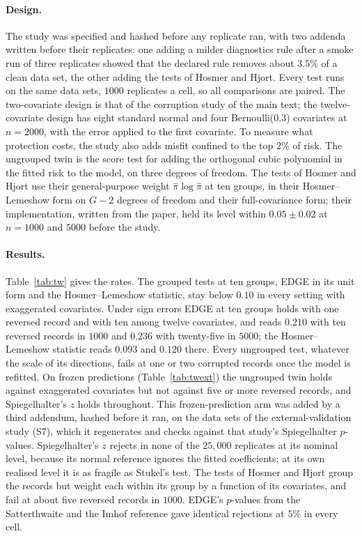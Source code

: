 \documentclass[11pt]{article}
\begin{document}
\paragraph{Design.} The study was specified and hashed before any replicate ran, with two addenda written
before their replicates: one adding a milder diagnostics rule after a smoke run of three replicates showed
that the declared rule removes about $3.5\%$ of a clean data set, the other adding the tests of Hosmer and
Hjort. Every test runs on the same data sets, $1000$ replicates a cell, so all comparisons are paired. The
two-covariate design is that of the corruption study of the main text; the twelve-covariate design has
eight standard normal and four Bernoulli($0.3$) covariates at $n=2000$, with the error applied to the first
covariate. To measure what protection costs, the study also adds misfit confined to the top $2\%$ of
risk. The ungrouped twin is the score test for adding the orthogonal cubic polynomial in the fitted
risk to the model, on three degrees of freedom. The tests of Hosmer and Hjort use their general-purpose
weight $\hat\pi\log\hat\pi$ at ten groups, in their Hosmer--Lemeshow form on $G-2$ degrees of freedom and
their full-covariance form; their implementation, written from the paper, held its level within
$0.05\pm0.02$ at $n=1000$ and $5000$ before the study.

\paragraph{Results.} Table~\ref{tab:tw} gives the rates. The grouped tests at ten groups, EDGE in its unit form and the Hosmer--Lemeshow statistic, stay below
$0.10$ in every setting with exaggerated covariates. Under sign errors EDGE at ten groups holds with one
reversed record and with ten among twelve covariates, and reads $0.210$ with ten reversed records in
$1000$ and $0.236$ with twenty-five in $5000$; the Hosmer--Lemeshow statistic reads $0.093$ and $0.120$
there. Every ungrouped test, whatever the scale of its directions, fails at one or two
corrupted records once the model is refitted. On frozen predictions (Table~\ref{tab:twext}) the ungrouped
twin holds against exaggerated covariates but not against five or more reversed records, and
Spiegelhalter's $z$ holds throughout. This frozen-prediction arm was added by a third addendum, hashed
before it ran, on the data sets of the external-validation study (S7), which it regenerates and checks
against that study's Spiegelhalter $p$-values.
Spiegelhalter's $z$ rejects in none of the $25{,}000$ replicates at its nominal level, because its normal
reference ignores the fitted coefficients; at its own realised level it is as fragile as Stukel's test. The
tests of Hosmer and Hjort group the records but weight each within its group by a function of its
covariates, and fail at about five reversed records in $1000$. EDGE's $p$-values from the
Satterthwaite and the Imhof reference gave identical rejections at $5\%$ in every cell.
\end{document}
